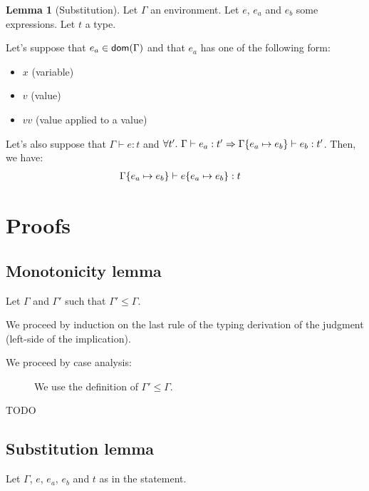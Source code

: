 \documentclass[a4paper]{article}
\theoremstyle{definition}
\newtheorem{lemma}{Lemma}
\begin{document}
        \begin{lemma}[Substitution]
          Let $\Gamma$ an environment. Let $e$, $e_a$ and $e_b$ some expressions. Let $t$ a type.

          Let's suppose that $e_a \in \textsf{dom}(\Gamma)$ and that $e_a$ has one of the following form:
          \begin{itemize}
            \item $x$ (variable)
            \item $v$ (value)
            \item $v v$ (value applied to a value)
          \end{itemize}
          Let's also suppose that $\Gamma \vdash e:t$ and $\forall t'.\ \Gamma \vdash e_a : t' \Rightarrow \Gamma\{e_a \mapsto e_b\} \vdash e_b:t'$.
          Then, we have:
          \begin{align*}
            &\Gamma \{e_a \mapsto e_b\} \vdash e \{e_a \mapsto e_b\}:t
          \end{align*}
        \end{lemma}

        \section{Proofs}

        \subsection{Monotonicity lemma}

        Let $\Gamma$ and $\Gamma'$ such that $\Gamma' \leq \Gamma$.

        We proceed by induction on the last rule of the typing derivation of the judgment (left-side of the implication).

        We proceed by case analysis:
        
        \begin{description}
          \item[] We use the definition of $\Gamma' \leq \Gamma$.
          \item[TODO] 
        \end{description}

        \subsection{Substitution lemma}

        Let $\Gamma$, $e$, $e_a$, $e_b$ and $t$ as in the statement.
\end{document}
